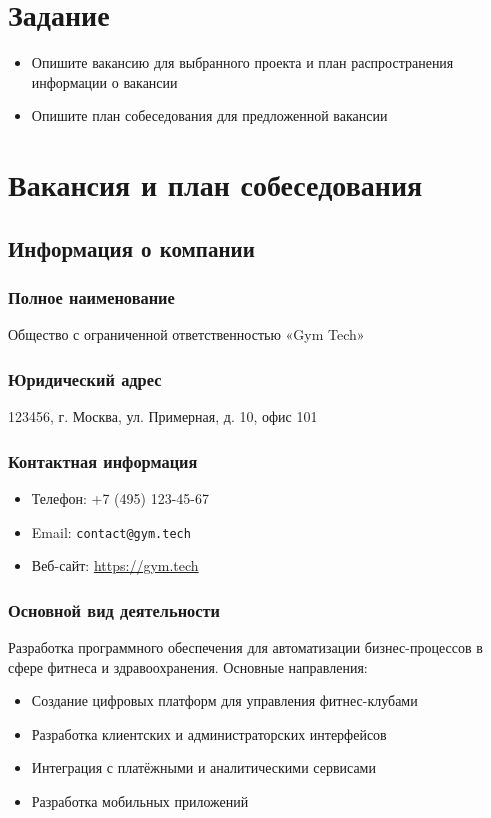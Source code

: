 \documentclass[14pt, russian]{matmex-diploma-custom}
\begin{document}

\maketitle
\section*{Задание}
    \begin{itemize}
        \item Опишите вакансию для выбранного проекта и план распространения информации о вакансии
        \item Опишите план собеседования для предложенной вакансии
    \end{itemize}


    \section{Вакансия и план собеседования}

    \subsection{Информация о компании}

    \subsubsection{Полное наименование}
    Общество с ограниченной ответственностью «Gym Tech»

    \subsubsection{Юридический адрес}
    123456, г. Москва, ул. Примерная, д. 10, офис 101

    \subsubsection{Контактная информация}
    \begin{itemize}
      \item Телефон: +7 (495) 123-45-67
      \item Email: \texttt{contact@gym.tech}
      \item Веб-сайт: \url{https://gym.tech}
    \end{itemize}


    \subsubsection{Основной вид деятельности}
    Разработка программного обеспечения для автоматизации бизнес-процессов в сфере фитнеса и здравоохранения.
    Основные направления:
    \begin{itemize}
        \item Создание цифровых платформ для управления фитнес-клубами
        \item Разработка клиентских и администраторских интерфейсов
        \item Интеграция с платёжными и аналитическими сервисами
        \item Разработка мобильных приложений
    \end{itemize}
\end{document}
